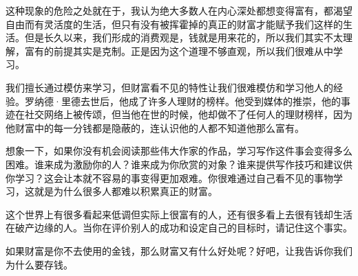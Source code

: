 这种现象的危险之处就在于，我认为绝大多数人在内心深处都想变得富有，都渴望自由而有灵活度的生活，但只有没有被挥霍掉的真正的财富才能赋予我们这样的生活。但是长久以来，我们形成的消费观是，钱就是用来花的，所以我们其实不太理解，富有的前提其实是克制。正是因为这个道理不够直观，所以我们很难从中学习。

我们擅长通过模仿来学习，但财富看不见的特性让我们很难模仿和学习他人的经验。罗纳德·里德去世后，他成了许多人理财的榜样。他受到媒体的推崇，他的事迹在社交网络上被传颂，但当他在世的时候，他却做不了任何人的理财榜样，因为他财富中的每一分钱都是隐蔽的，连认识他的人都不知道他那么富有。

想象一下，如果你没有机会阅读那些伟大作家的作品，学习写作这件事会变得多么困难。谁来成为激励你的人？谁来成为你欣赏的对象？谁来提供写作技巧和建议供你学习？这会让本就不容易的事变得更加艰难。你很难通过自己看不见的事物学习，这就是为什么很多人都难以积累真正的财富。

这个世界上有很多看起来低调但实际上很富有的人，还有很多看上去很有钱却生活在破产边缘的人。当你在评价别人的成功和设定自己的目标时，请记住这个事实。

如果财富是你不去使用的金钱，那么财富又有什么好处呢？好吧，让我告诉你我们为什么要存钱。
